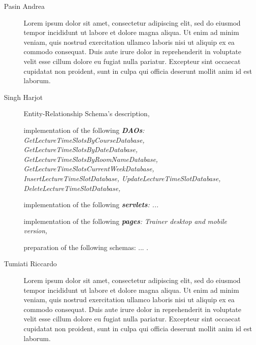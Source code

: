 \begin{description}
	\item[Pasin Andrea] Lorem ipsum dolor sit amet, consectetur adipiscing elit, sed do eiusmod tempor incididunt ut labore et dolore magna aliqua. Ut enim ad minim veniam, quis nostrud exercitation ullamco laboris nisi ut aliquip ex ea commodo consequat. Duis aute irure dolor in reprehenderit in voluptate velit esse cillum dolore eu fugiat nulla pariatur. Excepteur sint occaecat cupidatat non proident, sunt in culpa qui officia deserunt mollit anim id est laborum.
	\item[Singh Harjot] Entity-Relationship Schema's description,
	
	implementation of the following \textit{\textbf{DAOs}:
	    GetLectureTimeSlotsByCourseDatabase,
	    GetLectureTimeSlotsByDateDatabase,
	    GetLectureTimeSlotsByRoomNameDatabase,
	    GetLectureTimeSlotsCurrentWeekDatabase,
	    InsertLectureTimeSlotDatabase,
	    UpdateLectureTimeSlotDatabase,
	    DeleteLectureTimeSlotDatabase,
	}
    
	implementation of the following \textit{\textbf{servlets}: 
	    ... 
    }
    
	implementation of the following \textit{\textbf{pages}: 
	    Trainer desktop and mobile version,
    }
    
    preparation of the following schemas: ... .
	\item[Tumiati Riccardo] Lorem ipsum dolor sit amet, consectetur adipiscing elit, sed do eiusmod tempor incididunt ut labore et dolore magna aliqua. Ut enim ad minim veniam, quis nostrud exercitation ullamco laboris nisi ut aliquip ex ea commodo consequat. Duis aute irure dolor in reprehenderit in voluptate velit esse cillum dolore eu fugiat nulla pariatur. Excepteur sint occaecat cupidatat non proident, sunt in culpa qui officia deserunt mollit anim id est laborum.
\end{description}
